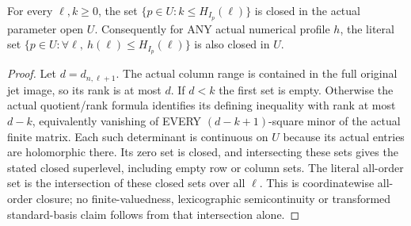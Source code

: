 \begin{theorem}
\label{hir:actual-holomorphic-family-fibre-hs-closed-superlevels}
\leanok
{}
For every $\ell,k\ge0$, the set
$\{p\in U:k\le H_{I_p}(\ell)\}$ is closed in the actual parameter open
$U$. Consequently for ANY actual numerical profile $h$, the literal set
$\{p\in U:\forall\ell,\ h(\ell)\le H_{I_p}(\ell)\}$ is also closed
in $U$.
\end{theorem}
\begin{proof}
Let $d=d_{n,\ell+1}$. The actual column range is contained in the full
original jet image, so its rank is at most $d$. If $d<k$ the first set is
empty. Otherwise the actual quotient/rank formula identifies its defining
inequality with rank at most $d-k$, equivalently vanishing of EVERY
$(d-k+1)$-square minor of the actual finite matrix. Each such determinant
is continuous on $U$ because its actual entries are holomorphic there.
Its zero set is closed, and intersecting these sets gives the stated
closed superlevel, including empty row or column sets. The literal
all-order set is the intersection of these closed sets over all $\ell$.
This is coordinatewise all-order closure; no finite-valuedness,
lexicographic semicontinuity or transformed standard-basis claim follows
from that intersection alone.
\end{proof}
